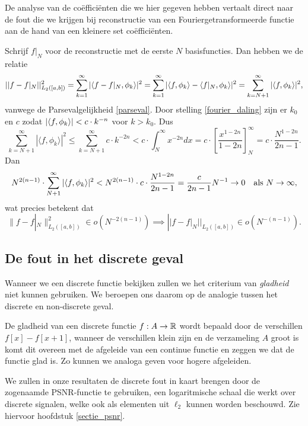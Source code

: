 De analyse van de co\"effici\"enten die we hier gegeven hebben vertaalt direct naar de fout die we krijgen
bij reconstructie van een Fouriergetransformeerde functie aan de hand van een kleinere set co\"effici\"enten.

\begin{gevolg}
Schrijf $f|_{N}$ voor de reconstructie met de eerste $N$ basisfuncties. Dan hebben we de relatie
\[
  || f - f|_N||^2_{L_2([a,b])} = \sum_{k=1}^\infty |\langle f-f|_N , \phi_k \rangle|^2 = \sum_{k=1}^\infty |\langle f , \phi_k \rangle 
  - \langle f|_N , \phi_k \rangle|^2 = \sum_{k=N+1}^\infty |\langle f , \phi_k \rangle|^2,
\]
vanwege de Parsevalgelijkheid \eqref{parseval}. Door stelling \ref{fourier_daling} zijn er $k_0$ en $c$ zodat ${\left| \langle f , \phi_k \rangle \right|} < c\cdot k^{-n}$ voor $k > k_0$. Dus
\[
	\sum_{k=N+1}^\infty | \langle f, \phi_{k} \rangle |^2 \leq \sum_{k=N+1}^\infty c \cdot k^{-2n} < c \cdot \int_{N}^\infty x^{-2n} dx = c \cdot \left[ \frac{x^{1-2n}}{1-2n} \right]^\infty_N = c \cdot \frac{N^{1-2n}}{2n-1}.
\]
Dan
\[
N^{2(n-1)} \cdot \sum_{N+1}^\infty |\langle f , \phi_k \rangle|^2 < N^{2(n-1)} \cdot c \cdot \frac{N^{1-2n}}{2n-1} = \frac{c}{2n-1} N^{-1} \to 0 \quad \text{als } N\to\infty,
\]
wat precies betekent dat
 \[
\|f-f|_{N}\|^2_{L_2([a,b])} \in o\left ( N^{-2(n-1)} \right) 
\implies ||f - f|_{N}||_{L_2([a,b])} \in o\left(N^{-(n-1)}\right).
\]
\end{gevolg}

\subsection{De fout in het discrete geval}
Wanneer we een discrete functie bekijken zullen we het criterium van \emph{gladheid} niet kunnen gebruiken.
We beroepen ons daarom op de analogie tussen het discrete en non-discrete geval.

De gladheid van een discrete functie $f:A\to\mathbb{R}$ wordt bepaald door de verschillen \mbox{$f[x]-f[x+1]$},
wanneer de verschillen klein zijn en de verzameling $A$ groot is komt dit overeen met de afgeleide van een 
continue functie en zeggen we dat de functie glad is. Zo kunnen we analoga geven voor hogere afgeleiden.

We zullen in onze resultaten de discrete fout in kaart brengen door de zogenaamde PSNR-functie te gebruiken,
een logaritmische schaal die werkt over discrete signalen, welke ook als elementen uit $\ell_2$ kunnen worden beschouwd. Zie hiervoor hoofdstuk \ref{sectie_psnr}.

